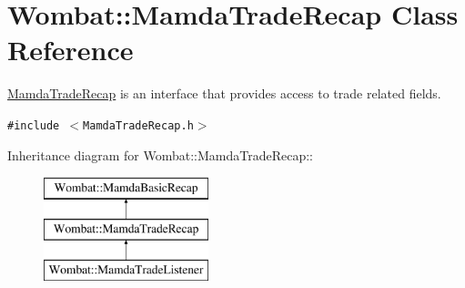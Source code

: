 \hypertarget{classWombat_1_1MamdaTradeRecap}{
\section{Wombat::Mamda\-Trade\-Recap Class Reference}
\label{classWombat_1_1MamdaTradeRecap}
}
\hyperlink{classWombat_1_1MamdaTradeRecap}{Mamda\-Trade\-Recap} is an interface that provides access to trade related fields.  


{\tt \#include $<$Mamda\-Trade\-Recap.h$>$}

Inheritance diagram for Wombat::Mamda\-Trade\-Recap::\begin{figure}[H]
\begin{center}
\leavevmode
\includegraphics[height=3cm]{classWombat_1_1MamdaTradeRecap}
\end{center}
\end{figure}
